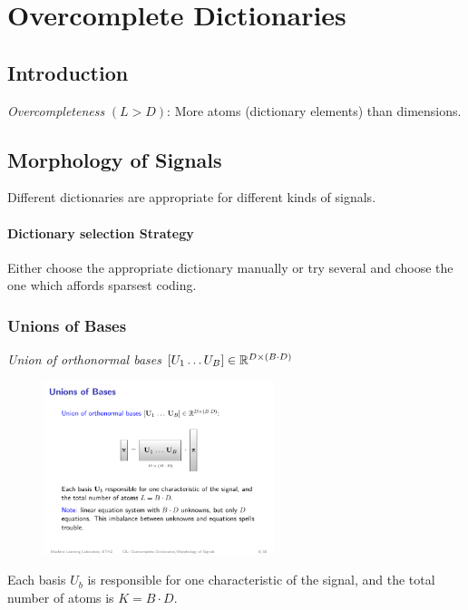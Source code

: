 \section{Overcomplete Dictionaries}
\subsection{Introduction}
\emph{Overcompleteness} $(L>D)$: More atoms (dictionary elements) than dimensions.

\subsection{Morphology of Signals}
Different dictionaries are appropriate for different kinds of signals.

\paragraph{Dictionary selection Strategy} Either choose the appropriate dictionary manually or try several and choose the one which affords sparsest coding.

\subsubsection{Unions of Bases} 
\emph{Union of orthonormal bases} $[U_1\ldots U_B] \in \mathbb{R}^{D\times (B\cdot D)}$
\begin{figure}[H]
    \centering
    \includegraphics[width=0.6\textwidth]{img/09_union_of_bases}
\end{figure}
Each basis $U_b$ is responsible for one characteristic of the signal, and the total number of atoms is $K=B\cdot D$.

